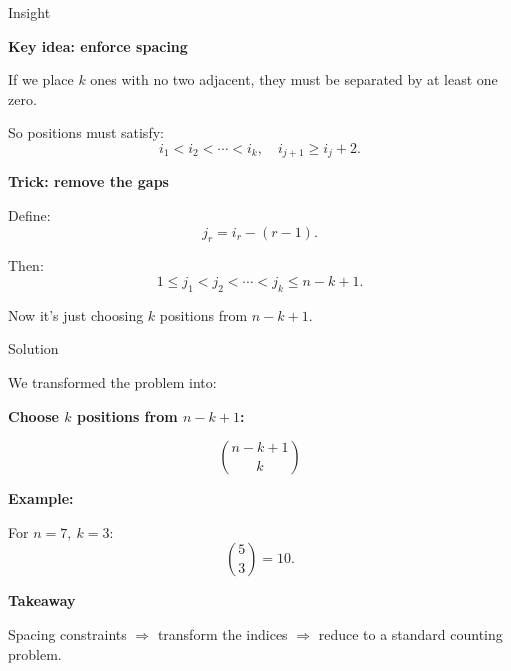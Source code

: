 \begin{frame}{Insight}

\textbf{Key idea: enforce spacing}

\medskip

If we place $k$ ones with no two adjacent, they must be separated by at least one zero.

\medskip

So positions must satisfy:
\[
i_1 < i_2 < \cdots < i_k, \quad i_{j+1} \ge i_j + 2.
\]

\medskip

\textbf{Trick: remove the gaps}

Define:
\[
j_r = i_r - (r-1).
\]

\medskip

Then:
\[
1 \le j_1 < j_2 < \cdots < j_k \le n-k+1.
\]

\medskip

Now it’s just choosing $k$ positions from $n-k+1$.

\end{frame}

\begin{frame}{Solution}

We transformed the problem into:

\medskip

\textbf{Choose $k$ positions from $n-k+1$:}

\[
\boxed{
\binom{n-k+1}{k}
}
\]

\medskip

\textbf{Example:}

For $n=7,\ k=3$:
\[
\binom{5}{3} = 10.
\]

\medskip

\textbf{Takeaway}

Spacing constraints $\Rightarrow$ transform the indices
$\Rightarrow$ reduce to a standard counting problem.

\end{frame}




